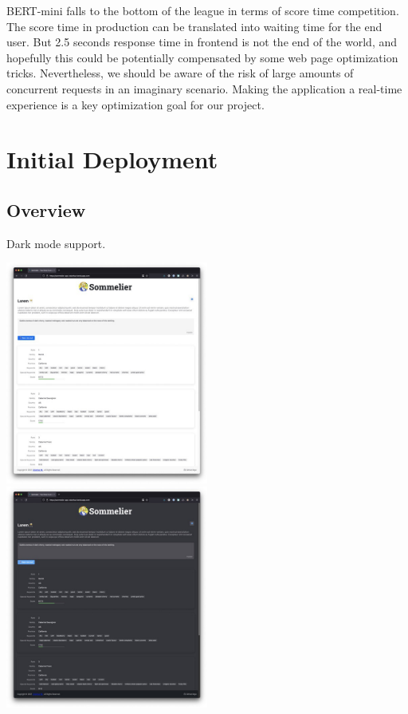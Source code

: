 \documentclass[
]{kaohandt}
\begin{document}
BERT-mini falls to the bottom of the league in terms of score time competition. The score time in production can be translated into waiting time for the end user. But 2.5 seconds response time in frontend is not the end of the world, and hopefully this could be potentially compensated by some web page optimization tricks. Nevertheless, we should be aware of the risk of large amounts of concurrent requests in an imaginary scenario. Making the application a real-time experience is a key optimization goal for our project.

\section{Initial Deployment}

\subsection*{Overview}

Dark mode support.

\includegraphics[width=0.5\textwidth]{sommelier-view-01.jpg}
\includegraphics[width=0.5\textwidth]{sommelier-view-02.jpg}
\end{document}
